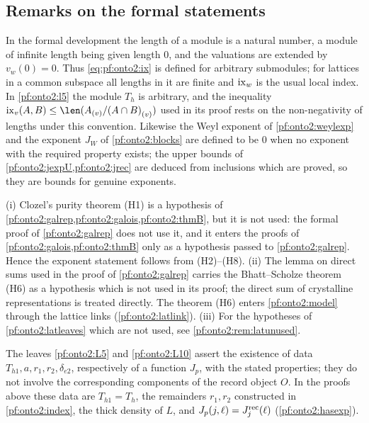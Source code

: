 \subsection{Remarks on the formal statements}\label{sec:pf:onto2:remarks}

\begin{remark}\label{pf:onto2:rem:len}
In the formal development the length of a module is a natural number, a module of infinite length being given length $0$, and
the valuations are extended by $v_w(0)=0$. Thus \eqref{eq:pf:onto2:ix} is defined for arbitrary submodules; for lattices in a
common subspace all lengths in it are finite and $\operatorname{ix}_w$ is the usual local index. In \cref{pf:onto2:l5} the module $T_h$ is
arbitrary, and the inequality $\ontoIIix_v(A,B)\le\len(\ontoIIloc vA/\ontoIIloc v{(A\cap B)})$ used in its proof rests on the
non-negativity of lengths under this convention. Likewise the Weyl exponent of \cref{pf:onto2:weylexp} and the exponent $J_W$ of
\cref{pf:onto2:blocks} are defined to be $0$ when no exponent with the required property exists; the upper bounds of
\cref{pf:onto2:jexpU,pf:onto2:jrec} are deduced from inclusions which are proved, so they are bounds for genuine exponents.
\end{remark}

\begin{remark}\label{pf:onto2:rem:unused}
(i) Clozel's purity theorem (H1) is a hypothesis of \cref{pf:onto2:galrep,pf:onto2:galois,pf:onto2:thmB}, but it is not used:
the formal proof of \cref{pf:onto2:galrep} does not use it, and it enters the proofs of \cref{pf:onto2:galois,pf:onto2:thmB} only
as a hypothesis passed to \cref{pf:onto2:galrep}. Hence the exponent statement follows from (H2)--(H8).
(ii) The lemma on direct sums  used in the proof of \cref{pf:onto2:galrep} carries the
Bhatt--Scholze theorem (H6) as a hypothesis which is not used in its proof; the direct sum of crystalline representations is
treated directly. The theorem (H6) enters \cref{pf:onto2:model} through the lattice links
(\cref{pf:onto2:latlink}).
(iii) For the hypotheses of \cref{pf:onto2:latleaves} which are not used, see \cref{pf:onto2:rem:latunused}.
\end{remark}

\begin{remark}\label{pf:onto2:rem:exist}
The leaves \ref{pf:onto2:L5} and \ref{pf:onto2:L10} assert the existence of data $T_{h1},a,r_1,r_2,\delta_{e2}$, respectively of a
function $J_p$, with the stated properties; they do not involve the corresponding components of the record object $O$. In the
proofs above these data are $T_{h1}=T_h$, the remainders $r_1,r_2$ constructed in \cref{pf:onto2:index}, the thick density of $L$,
and $J_p(j,\ell)=J^{\mathrm{rec}}_j(\ell)$ (\cref{pf:onto2:hasexp}).
\end{remark}

